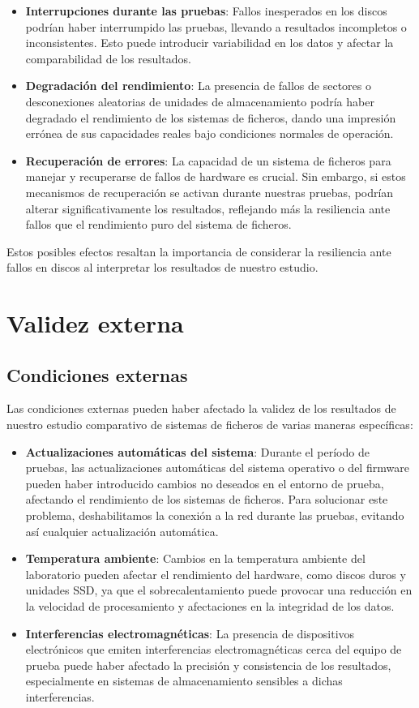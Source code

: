 \begin{itemize}
    \item \textbf{Interrupciones durante las pruebas}: Fallos inesperados en los discos podrían haber interrumpido las pruebas, llevando a resultados incompletos o inconsistentes. Esto puede introducir variabilidad en los datos y afectar la comparabilidad de los resultados.
    \item \textbf{Degradación del rendimiento}: La presencia de fallos de sectores o desconexiones aleatorias de unidades de almacenamiento podría haber degradado el rendimiento de los sistemas de ficheros, dando una impresión errónea de sus capacidades reales bajo condiciones normales de operación.
    \item \textbf{Recuperación de errores}: La capacidad de un sistema de ficheros para manejar y recuperarse de fallos de hardware es crucial. Sin embargo, si estos mecanismos de recuperación se activan durante nuestras pruebas, podrían alterar significativamente los resultados, reflejando más la resiliencia ante fallos que el rendimiento puro del sistema de ficheros.
\end{itemize}

Estos posibles efectos resaltan la importancia de considerar la resiliencia ante fallos en discos al interpretar los resultados de nuestro estudio.

\section{Validez externa}

\subsection{Condiciones externas}

Las condiciones externas pueden haber afectado la validez de los resultados de nuestro estudio comparativo de sistemas de ficheros de varias maneras específicas:

\begin{itemize}
    \item \textbf{Actualizaciones automáticas del sistema}: Durante el período de pruebas, las actualizaciones automáticas del sistema operativo o del firmware pueden haber introducido cambios no deseados en el entorno de prueba, afectando el rendimiento de los sistemas de ficheros. Para solucionar este problema, deshabilitamos la conexión a la red durante las pruebas, evitando así cualquier actualización automática.
    \item \textbf{Temperatura ambiente}: Cambios en la temperatura ambiente del laboratorio pueden afectar el rendimiento del hardware, como discos duros y unidades SSD, ya que el sobrecalentamiento puede provocar una reducción en la velocidad de procesamiento y afectaciones en la integridad de los datos.
    \item \textbf{Interferencias electromagnéticas}: La presencia de dispositivos electrónicos que emiten interferencias electromagnéticas cerca del equipo de prueba puede haber afectado la precisión y consistencia de los resultados, especialmente en sistemas de almacenamiento sensibles a dichas interferencias.
\end{itemize}

